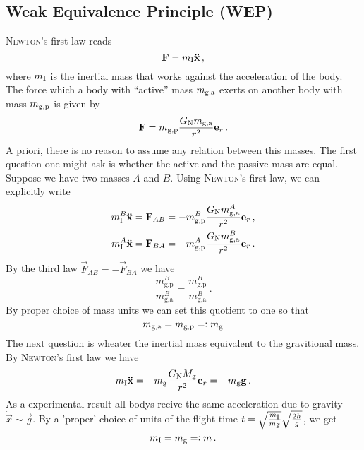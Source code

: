 \subsection*{Weak Equivalence Principle (WEP)}
\textsc{Newton}'s first law reads
\begin{equation}
    \vec{F}=m\textsubscript{I} \vec{\ddot{x}} \, ,
\end{equation}
where $m\textsubscript{I}$ is the inertial mass that works against the acceleration of the body.
The force which a body with ``active'' mass $m\textsubscript{g,a}$ exerts on
another body with mass $m\textsubscript{g,p}$ is given by 
\begin{equation}
    \vec{F}=m\textsubscript{g,p}\frac{G\textsubscript{N}m\textsubscript{g,a}}{r^2}\vec{e}_r \, .
\end{equation}
A priori, there is no reason to assume any relation between this masses.
The first question one might ask is whether the active and the passive mass are equal.
Suppose we have two masses $A$ and $B$. Using \textsc{Newton}'s first law, we
can explicitly write
\begin{align}
    m^{B}_{\text{I}}\vec{\ddot{x}}&=\vec{F}_{AB}=-
    m^{B}_{\text{g,p}}\frac{G\textsubscript{N}m^{A}_{\text{g,a}}}{r^2}\vec{e}_r
    \, ,\\
    m^{A}_{\text{I}}\vec{\ddot{x}}&=\vec{F}_{BA}=-
    m^{A}_{\text{g,p}}\frac{G\textsubscript{N}m^{B}_{\text{g,a}}}{r^2}\vec{e}_r
    \, .
\end{align}
By the third law $\vec{F}_{AB}=-\vec{F}_{BA}$ we have
\begin{equation}
\frac{m^{B}_{\text{g,p}}}{m^{B}_{\text{g,a}}}=\frac{m^{B}_{\text{g,p}}}{m^{B}_{\text{g,a}}}\,.
\end{equation}
By proper choice of mass units we can set this quotient to one so that 
\begin{equation}
m\textsubscript{g,a}=m\textsubscript{g,p}=:m\textsubscript{g}
\end{equation}
The next question is wheater the inertial mass equivalent to the gravitional
mass.
By \textsc{Newton}'s first law we have
\begin{equation}
m\textsubscript{I}\vec{\ddot{x}}
=-m_{\text{g}}\frac{G\textsubscript{N}M_{\text{g}}}{r^2}\vec{e}_r 
=-m_{\text{g}}\vec{g}\,.
\end{equation}
As a experimental result all bodys recive the same acceleration due to gravity
$\ddot{\vec{x}}\sim \vec{g}$. By a 'proper' choice of units of the flight-time
$t=\sqrt{\frac{m\textsubscript{I}}{m\textsubscript{g}}}\sqrt{\frac{2h}{g}}$,
we get
\begin{equation}
m\textsubscript{I}=m\textsubscript{g}=:m\,.
\end{equation}
